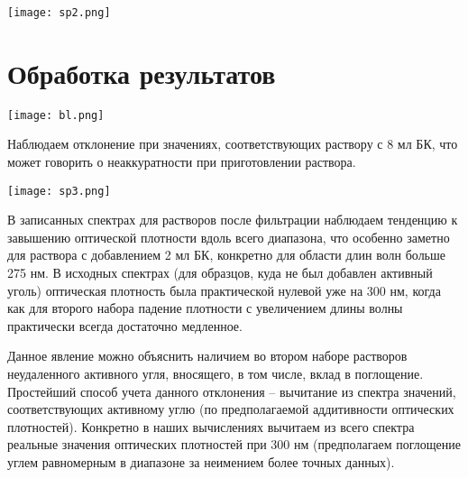 \documentclass[a4paper]{article}
\begin{document}
\graphicspath{{./images/}}
		\begin{center}
		
			\texttt{[image: sp2.png]}
	

	\par
 \vspace{0.3cm}
 \end{center}
\vspace{0.3cm}
\par



\section{\LARGE \textbf{Обработка результатов}}
\par

\graphicspath{{./images/}}
		\begin{center}
		
			\texttt{[image: bl.png]}
	

	\par
 \vspace{0.3cm}
 \end{center}

 Наблюдаем отклонение при значениях, соответствующих раствору с 8 мл БК, что может говорить о неаккуратности при приготовлении раствора.

\graphicspath{{./images/}}
		\begin{center}
		
			\texttt{[image: sp3.png]}
	

	\par
 \vspace{0.3cm}
 \end{center}
\vspace{0.3cm}
\par

В записанных спектрах для растворов после фильтрации наблюдаем тенденцию к завышению оптической плотности вдоль всего диапазона, что особенно заметно для раствора с добавлением 2 мл БК, конкретно для области длин волн больше 275 нм. В исходных спектрах (для образцов, куда не был добавлен активный уголь) оптическая плотность была практической нулевой уже на 300 нм, когда как для второго набора падение плотности с увеличением длины волны практически всегда достаточно медленное. \par \vspace{0.3 cm}
Данное явление можно объяснить наличием во втором наборе растворов неудаленного активного угля, вносящего, в том числе, вклад в поглощение. Простейший способ учета данного отклонения -- вычитание из спектра значений, соответствующих активному углю (по предполагаемой аддитивности оптических плотностей). Конкретно в наших вычислениях вычитаем из всего спектра реальные значения оптических плотностей при 300 нм (предполагаем поглощение углем равномерным в диапазоне за неимением более точных данных).
\end{document}

